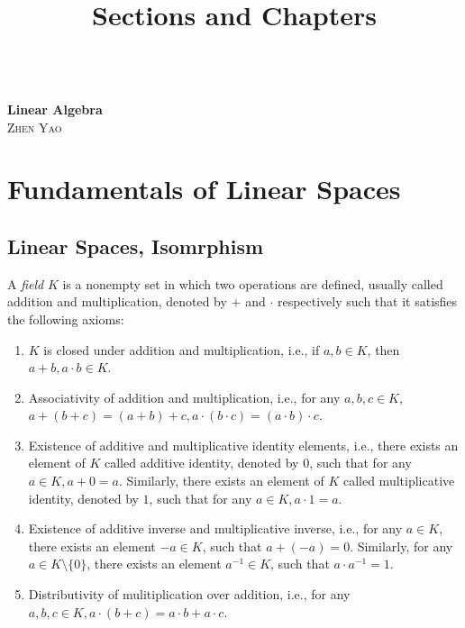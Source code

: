 \documentclass[10pt]{book}
\title{Sections and Chapters}
\theoremstyle{definition}
\numberwithin{equation}{chapter}
\begin{document}
\frontmatter

\begin{titlepage}
	\begin{center}
	\textbf{\LARGE{}} \\
	\vspace{40mm}
    \textbf{\Huge{Linear Algebra}} \\
    \vspace{10mm} %
    \large{\textsc{Zhen Yao}}\\
    \large{\textsc{}}
    \end{center}
\end{titlepage}

\tableofcontents{}
\mainmatter

\newpage

\chapter{Fundamentals of Linear Spaces}
\section{Linear Spaces, Isomrphism}

A \emph{field} $K$ is a nonempty set in which two operations are defined, usually called addition and multiplication, denoted by $+$ and $\cdot$ respectively such that it satisfies the following axioms:
\begin{enumerate}[label=(\arabic*)]
    \item $K$ is closed under addition and multiplication, i.e., if $a,b\in K$, then $a+b, a\cdot b\in K$.
    \item Associativity of addition and multiplication, i.e., for any $a,b,c\in K$, $a+(b+c) = (a+b)+c, a\cdot(b\cdot c) = (a\cdot b)\cdot c$.
    \item Existence of additive and multiplicative identity elements, i.e., there exists an element of $K$ called additive identity, denoted by $0$, such that for any $a
    \in K, a+0=a$. Similarly, there exists an element of $K$ called multiplicative identity, denoted by $1$, such that for any $a\in K, a\cdot 1=a$.
    \item Existence of additive inverse and multiplicative inverse, i.e., for any $a\in K$, there exists an element $-a\in K$, such that $a+(-a)=0$. Similarly, for any $a\in K\setminus \{0\}$, there exists an element $a^{-1}\in K$, such that $a\cdot a^{-1}=1$.
    \item Distributivity of mulitiplication over addition, i.e., for any $a,b,c\in K, a\cdot(b+c)=a\cdot b+a\cdot c$.
\end{enumerate}
\end{document}
